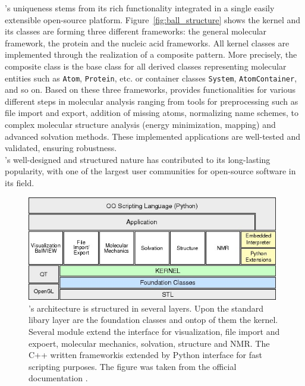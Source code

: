 \ball's uniqueness stems from its rich functionality integrated in a single easily extensible open-source platform. Figure~\ref{fig:ball_structure} shows the kernel and its classes are forming three different frameworks: the general molecular framework, the protein and the nucleic acid frameworks. All kernel classes are implemented through the realization of a composite pattern. More precisely, the composite class is the base class for all derived classes representing molecular entities such as \texttt{Atom}, \texttt{Protein}, etc. or container classes \texttt{System}, \texttt{AtomContainer}, and so on. 
Based on these three frameworks, \ball provides functionalities for various different steps in molecular analysis ranging from tools for preprocessing such as file import and export, addition of missing atoms, normalizing name schemes, to complex molecular structure analysis (energy minimization, mapping) and advanced solvation methods. These implemented applications are well-tested and validated, ensuring robustness.  \\
\ball's well-designed and structured nature has contributed to its long-lasting popularity, with one of the largest user communities for open-source software in its field.



\begin{figure}[t]
	\centerline{\includegraphics[width=11cm]{gfx/BALL-architecture.jpeg}}
	\caption{\ball's architecture is structured in several layers. Upon the standard libary layer are the foundation classes and ontop of them the kernel. Several module extend the interface for visualization, file import and expoert, molecular mechanics, solvation, structure and NMR. The C++ written frameworkis extended by Python interface for fast scripting purposes. The figure was taken from the official \ball documentation \cite{BALLTutorial}.}
	\label{fig:ball_architecture}
\end{figure}



